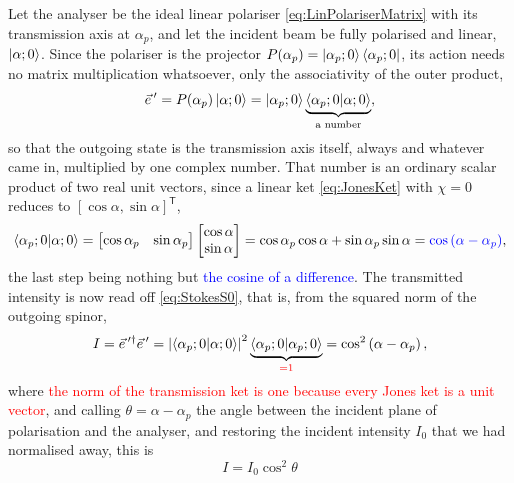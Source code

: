             Let the analyser be the ideal linear polariser \ref{eq:LinPolariserMatrix} with its transmission axis at $\alpha_p$, and let the incident beam be fully polarised and linear, $\ket{\alpha;0}$. Since the polariser is the projector $P(\alpha_p)=\ket{\alpha_p;0}\bra{\alpha_p;0}$, its action needs no matrix multiplication whatsoever, only the associativity of the outer product,
            \begin{equation}\label{eq:MalusProjection}
                \vec{e}\,' = P(\alpha_p)\ket{\alpha;0} = \ket{\alpha_p;0}\underbrace{\braket{\alpha_p;0|\alpha;0}}_{\text{a number}},
            \end{equation}
            so that the outgoing state is the transmission axis itself, always and whatever came in, multiplied by one complex number. That number is an ordinary scalar product of two real unit vectors, since a linear ket \ref{eq:JonesKet} with $\chi=0$ reduces to $\left[\cos\alpha,\sin\alpha\right]^{\mathsf{T}}$,
            \begin{equation}\label{eq:MalusOverlap}
                \braket{\alpha_p;0|\alpha;0} = \begin{bmatrix}\cos\alpha_p & \sin\alpha_p\end{bmatrix}\begin{bmatrix}\cos\alpha\\ \sin\alpha\end{bmatrix} = \cos\alpha_p\cos\alpha+\sin\alpha_p\sin\alpha = \textcolor{blue}{\cos\left(\alpha-\alpha_p\right)},
            \end{equation}
            the last step being nothing but \textcolor{blue}{the cosine of a difference}. The transmitted intensity is now read off \ref{eq:StokesS0}, that is, from the squared norm of the outgoing spinor,
            \begin{equation*}
                I = \vec{e}\,'^{\dagger}\vec{e}\,' = \left|\braket{\alpha_p;0|\alpha;0}\right|^2\underbrace{\braket{\alpha_p;0|\alpha_p;0}}_{\textcolor{red}{=1}} = \cos^2\left(\alpha-\alpha_p\right),
            \end{equation*}
            where \textcolor{red}{the norm of the transmission ket is one because every Jones ket is a unit vector}, and calling $\theta=\alpha-\alpha_p$ the angle between the incident plane of polarisation and the analyser, and restoring the incident intensity $I_0$ that we had normalised away, this is
            \begin{equation}\label{eq:MalusLaw}
                \boxed{\;I = I_0\cos^2\theta\;}
            \end{equation}

